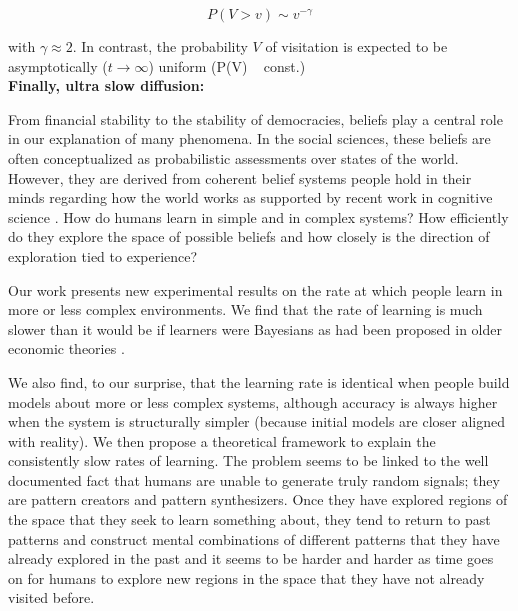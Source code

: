 \begin{equation}
P(V > v) \sim v^{-\gamma}
\end{equation}

with $\gamma \approx 2$. In contrast, the probability $V$ of visitation is expected to be asymptotically ($t \rightarrow \infty$) uniform (P(V) ~ const.)\\

{\bf Finally, ultra slow diffusion: }



\clearpage

From financial stability to the stability of democracies, beliefs play a central role in our explanation of many phenomena. In the social sciences, these beliefs are often conceptualized as probabilistic assessments over states of the world.  However, they are derived from coherent belief systems people hold in their minds regarding how the world works as supported by recent work in cognitive science \cite{lombrozo2006structure, anderson1990cognitive}.  How do humans learn in simple and in complex systems?  How efficiently do they explore the space of possible beliefs and how closely is the direction of exploration tied to experience?  

Our work presents new experimental results on the rate at which people learn in more or less complex environments. We find that the rate of learning is much slower than it would be if learners were Bayesians as had been proposed in older economic theories \cite{Boyer84, Prescott72, Rothschild74, McLennan84, Mirman84, Easley89, Kiefer89}.

 We also find, to our surprise, that the learning rate is identical when people build models about more or less complex systems, although accuracy is always higher when the system is structurally simpler (because initial models are closer aligned with reality). We then propose a theoretical framework to explain the consistently slow rates of learning.  The problem seems to be linked to the well documented fact that humans are unable to generate truly random signals; they are pattern creators and pattern synthesizers.  Once they have explored regions of the space that they seek to learn something about, they tend to return to past patterns and construct mental combinations of different patterns that they have already explored in the past and it seems to be harder and harder as time goes on for humans to explore new regions in the space that they have not already visited before.

